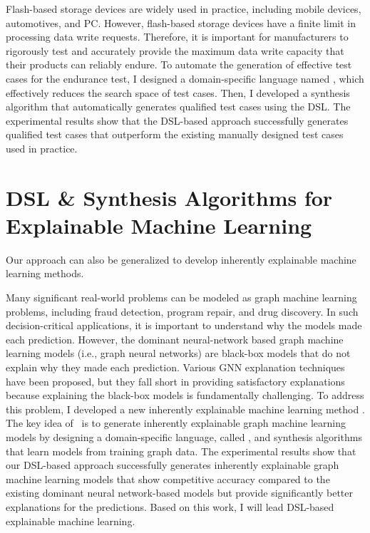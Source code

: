 \documentclass[11pt]{article}
\newcommand{\myparagraph}[1]{\medskip\noindent{\it \textbf{#1.}}}
\begin{document}
\myparagraph{ARES~\cite{ARES23}}
%
Flash-based storage devices are widely used in practice, including mobile devices, automotives, and PC. 
%
However, flash-based storage devices have a finite limit in processing data write requests.
%
Therefore, it is important for manufacturers to rigorously test and accurately provide the maximum data write capacity that their products can reliably endure.
%
To automate the generation of effective test cases for the endurance test, I designed a domain-specific language named \AbstractRelativeWritePattern, which effectively reduces the search space of test cases.
%
Then, I developed a synthesis algorithm that automatically generates qualified test cases using the DSL.
%
The experimental results show that the DSL-based approach successfully generates qualified test cases that outperform the existing manually designed test cases used in practice.



\section{DSL \& Synthesis Algorithms for Explainable Machine Learning}
%
Our approach can also be generalized to develop inherently explainable machine learning methods. 
%

\myparagraph{PL4XGL}
Many significant real-world problems can be modeled as graph machine learning problems, including fraud detection, program repair, and drug discovery.
%
In such decision-critical applications, it is important to understand why the models made each prediction.
%
However, the dominant neural-network based graph machine learning models (i.e., graph neural networks) are black-box models that do not explain why they made each prediction.
%
Various GNN explanation techniques have been proposed, but they fall short in providing satisfactory explanations because explaining the black-box models is fundamentally challenging.
%
To address this problem, I developed a new inherently explainable machine learning method {\PLXGL}.
%
The key idea of \PLXGL~is to generate inherently explainable graph machine learning models by designing a domain-specific language, called \GDL, and synthesis algorithms that learn models from training graph data.
%
The experimental results show that our DSL-based approach successfully generates inherently explainable graph machine learning models that show competitive accuracy compared to the existing dominant neural network-based models but provide significantly better explanations for the predictions.
%
Based on this work, I will lead DSL-based explainable machine learning.
\end{document}
